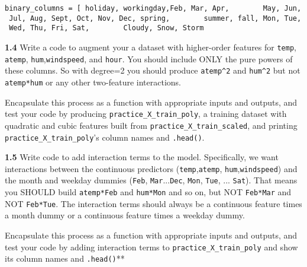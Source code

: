 \documentclass[11pt]{article}
\begin{document}
\texttt{binary\_columns\ =\ {[}\ \textquotesingle{}holiday\textquotesingle{},\ \textquotesingle{}workingday\textquotesingle{},\textquotesingle{}Feb\textquotesingle{},\ \textquotesingle{}Mar\textquotesingle{},\ \textquotesingle{}Apr\textquotesingle{},\ \ \ \ \ \ \ \ \textquotesingle{}May\textquotesingle{},\ \textquotesingle{}Jun\textquotesingle{},\ \textquotesingle{}Jul\textquotesingle{},\ \textquotesingle{}Aug\textquotesingle{},\ \textquotesingle{}Sept\textquotesingle{},\ \textquotesingle{}Oct\textquotesingle{},\ \textquotesingle{}Nov\textquotesingle{},\ \textquotesingle{}Dec\textquotesingle{},\ \textquotesingle{}spring\textquotesingle{},\ \ \ \ \ \ \ \ \textquotesingle{}summer\textquotesingle{},\ \textquotesingle{}fall\textquotesingle{},\ \textquotesingle{}Mon\textquotesingle{},\ \textquotesingle{}Tue\textquotesingle{},\ \textquotesingle{}Wed\textquotesingle{},\ \textquotesingle{}Thu\textquotesingle{},\ \textquotesingle{}Fri\textquotesingle{},\ \textquotesingle{}Sat\textquotesingle{},\ \ \ \ \ \ \ \ \textquotesingle{}Cloudy\textquotesingle{},\ \textquotesingle{}Snow\textquotesingle{},\ \textquotesingle{}Storm\textquotesingle{}{]}}

\textbf{1.4} Write a code to augment your a dataset with higher-order
features for \texttt{temp}, \texttt{atemp},
\texttt{hum},\texttt{windspeed}, and \texttt{hour}. You should include
ONLY the pure powers of these columns. So with degree=2 you should
produce \texttt{atemp\^{}2} and \texttt{hum\^{}2} but not
\texttt{atemp*hum} or any other two-feature interactions.

Encapsulate this process as a function with appropriate inputs and
outputs, and test your code by producing
\texttt{practice\_X\_train\_poly}, a training dataset with quadratic and
cubic features built from \texttt{practice\_X\_train\_scaled}, and
printing \texttt{practice\_X\_train\_poly}'s column names and
\texttt{.head()}.

\textbf{1.5} Write code to add interaction terms to the model.
Specifically, we want interactions between the continuous predictors
(\texttt{temp},\texttt{atemp}, \texttt{hum},\texttt{windspeed}) and the
month and weekday dummies (\texttt{Feb}, \texttt{Mar}...\texttt{Dec},
\texttt{Mon}, \texttt{Tue}, ... \texttt{Sat}). That means you SHOULD
build \texttt{atemp*Feb} and \texttt{hum*Mon} and so on, but NOT
\texttt{Feb*Mar} and NOT \texttt{Feb*Tue}. The interaction terms should
always be a continuous feature times a month dummy or a continuous
feature times a weekday dummy.

Encapsulate this process as a function with appropriate inputs and
outputs, and test your code by adding interaction terms to
\texttt{practice\_X\_train\_poly} and show its column names and
\texttt{.head()}**
\end{document}
